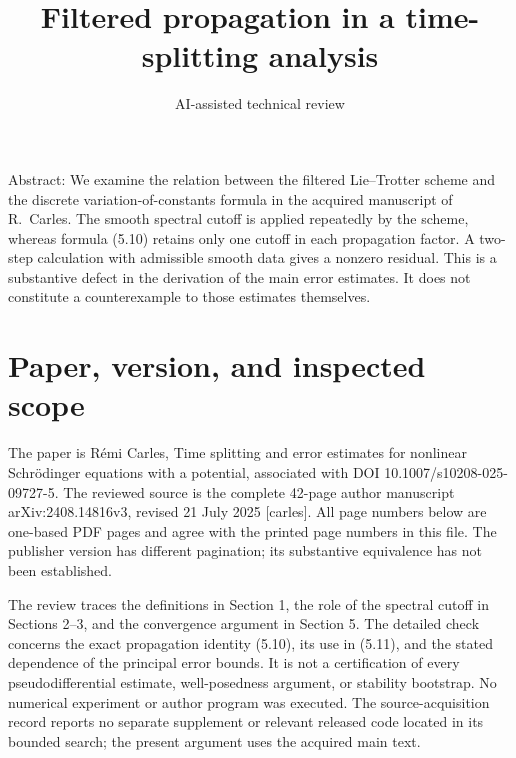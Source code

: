 \documentclass[10pt]{article}
\title{Filtered propagation in a time-splitting analysis}
\author{AI-assisted technical review}
\date{}
\begin{document}
\maketitle
Abstract: We examine the relation between the filtered Lie–Trotter scheme and the discrete variation-of-constants formula in the acquired manuscript of R. Carles. The smooth spectral cutoff is applied repeatedly by the scheme, whereas formula (5.10) retains only one cutoff in each propagation factor. A two-step calculation with admissible smooth data gives a nonzero residual. This is a substantive defect in the derivation of the main error estimates. It does not constitute a counterexample to those estimates themselves.\par
\section*{Paper, version, and inspected scope}
The paper is Rémi Carles, Time splitting and error estimates for nonlinear Schrödinger equations with a potential, associated with DOI 10.1007/s10208-025-09727-5. The reviewed source is the complete 42-page author manuscript arXiv:2408.14816v3, revised 21 July 2025 [carles]. All page numbers below are one-based PDF pages and agree with the printed page numbers in this file. The publisher version has different pagination; its substantive equivalence has not been established.\par
The review traces the definitions in Section 1, the role of the spectral cutoff in Sections 2–3, and the convergence argument in Section 5. The detailed check concerns the exact propagation identity (5.10), its use in (5.11), and the stated dependence of the principal error bounds. It is not a certification of every pseudodifferential estimate, well-posedness argument, or stability bootstrap. No numerical experiment or author program was executed. The source-acquisition record reports no separate supplement or relevant released code located in its bounded search; the present argument uses the acquired main text.\par
\end{document}
